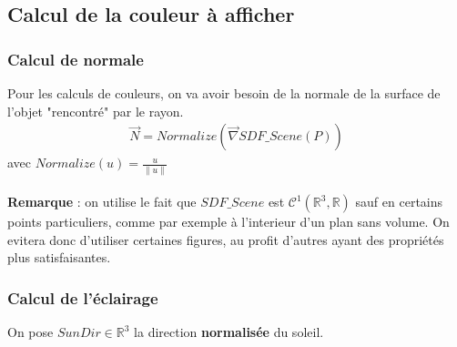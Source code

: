 \subsection{Calcul de la couleur à afficher}
\subsubsection{Calcul de normale}
Pour les calculs de couleurs, on va avoir besoin de la normale de la surface de l'objet "rencontré" par le rayon.
\begin{align*}
\Vec{N}=Normalize(\Vec{\nabla}SDF\_Scene(P))
\end{align*}
avec $Normalize(u)=\frac{u}{\|u\|}$\\
\\
\textbf{Remarque} : on utilise le fait que $SDF\_Scene$ est $\mathcal{C}^1(\mathbb{R}^3,\mathbb{R})$ sauf en certains points particuliers, comme par exemple à l'interieur d'un plan sans volume. On evitera donc d'utiliser certaines figures, au profit d'autres ayant des propriétés plus satisfaisantes.
\subsubsection{Calcul de l'éclairage}
On pose $SunDir \in \mathbb{R}^3$ la direction \textbf{normalisée} du soleil.
